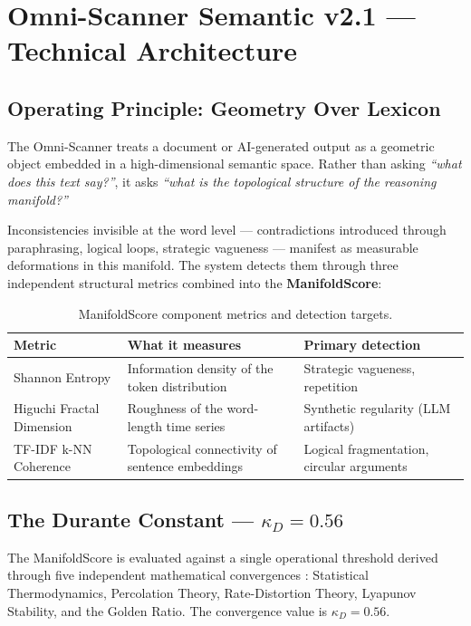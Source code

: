 \documentclass[11pt, a4paper]{article}
\begin{document}
\section{Omni-Scanner Semantic v2.1 --- Technical Architecture}

\subsection{Operating Principle: Geometry Over Lexicon}

The Omni-Scanner treats a document or AI-generated output as a geometric object
embedded in a high-dimensional semantic space. Rather than asking
\emph{``what does this text say?''}, it asks
\emph{``what is the topological structure of the reasoning manifold?''}

Inconsistencies invisible at the word level --- contradictions introduced through
paraphrasing, logical loops, strategic vagueness --- manifest as measurable
deformations in this manifold. The system detects them through three independent
structural metrics combined into the \textbf{ManifoldScore}:

\begin{table}[H]
\centering
\caption{ManifoldScore component metrics and detection targets.}
\begin{tabular}{p{3.8cm} p{5.2cm} p{4.6cm}}
\toprule
\textbf{Metric} & \textbf{What it measures} & \textbf{Primary detection} \\
\midrule
Shannon Entropy & Information density of the token distribution &
  Strategic vagueness, repetition \\
Higuchi Fractal Dimension & Roughness of the word-length time series &
  Synthetic regularity (LLM artifacts) \\
TF-IDF k-NN Coherence & Topological connectivity of sentence embeddings &
  Logical fragmentation, circular arguments \\
\bottomrule
\end{tabular}
\end{table}

\subsection{The Durante Constant --- $\kappa_D = 0.56$}

The ManifoldScore is evaluated against a single operational threshold derived
through five independent mathematical convergences \cite{durante2026manifold}:
Statistical Thermodynamics, Percolation Theory, Rate-Distortion Theory,
Lyapunov Stability, and the Golden Ratio. The convergence value is
$\kappa_D = 0.56$.
\end{document}
